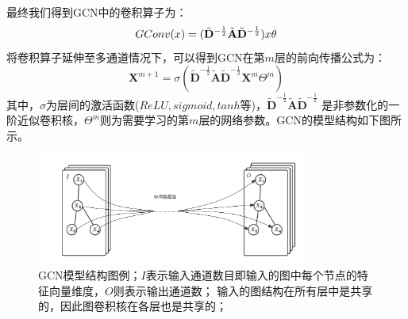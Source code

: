   最终我们得到GCN\textsuperscript{\cite{kipfGCN}}中的卷积算子为：
  \begin{equation} \label{gcn_conv_4}
    GConv(\mathnormal{x}) = 
    (\tilde{\mathbf{D}}^{-\frac{1}{2}} \tilde{\mathbf{A}} \tilde{\mathbf{D}}^{-\frac{1}{2}})
    \mathnormal{x}
    \theta
  \end{equation}
  将卷积算子延伸至多通道情况下，可以得到GCN在第$m$层的前向传播公式为：
  \begin{equation} \label{gcn_forward}
    \mathbf{X}^{m+1} = \sigma(
      \tilde{\mathbf{D}}^{-\frac{1}{2}} \tilde{\mathbf{A}} \tilde{\mathbf{D}}^{-\frac{1}{2}}
      \mathbf{X}^{m}\Theta^{m}
      )
  \end{equation}
  其中，$\sigma$为层间的激活函数($ReLU, sigmoid, tanh$等)，$ \tilde{\mathbf{D}}^{-\frac{1}{2}} \tilde{\mathbf{A}} \tilde{\mathbf{D}}^{-\frac{1}{2}}$
  是非参数化的一阶近似卷积核，$\Theta^{m}$则为需要学习的第$m$层的网络参数。GCN的模型结构如下图所示。
  \begin{figure}[htbp]
    \centering
    \includegraphics[width=0.8\textwidth]{Figures/GCN-model.png}
    \caption{GCN模型结构图例；$I$表示输入通道数目即输入的图中每个节点的特征向量维度，$O$则表示输出通道数；
    输入的图结构在所有层中是共享的，因此图卷积核在各层也是共享的；}
    \label{pic:GCN-model}
  \end{figure}
  
  \newpage
